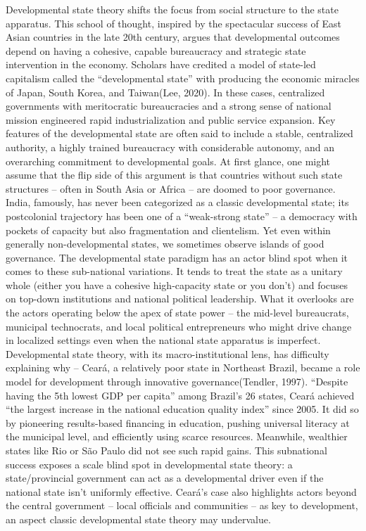 Developmental state theory shifts the focus from social structure to the state apparatus. This school of thought, inspired by the spectacular success of East Asian countries in the late 20th century, argues that developmental outcomes depend on having a cohesive, capable bureaucracy and strategic state intervention in the economy. Scholars have credited a model of state-led capitalism called the “developmental state” with producing the economic miracles of Japan, South Korea, and Taiwan(Lee, 2020). In these cases, centralized governments with meritocratic bureaucracies and a strong sense of national mission engineered rapid industrialization and public service expansion. Key features of the developmental state are often said to include a stable, centralized authority, a highly trained bureaucracy with considerable autonomy, and an overarching commitment to developmental goals. At first glance, one might assume that the flip side of this argument is that countries without such state structures – often in South Asia or Africa – are doomed to poor governance. India, famously, has never been categorized as a classic developmental state; its postcolonial trajectory has been one of a “weak-strong state” – a democracy with pockets of capacity but also fragmentation and clientelism. Yet even within generally non-developmental states, we sometimes observe islands of good governance. The developmental state paradigm has an actor blind spot when it comes to these sub-national variations. It tends to treat the state as a unitary whole (either you have a cohesive high-capacity state or you don’t) and focuses on top-down institutions and national political leadership. What it overlooks are the actors operating below the apex of state power – the mid-level bureaucrats, municipal technocrats, and local political entrepreneurs who might drive change in localized settings even when the national state apparatus is imperfect. Developmental state theory, with its macro-institutional lens, has difficulty explaining why – Ceará, a relatively poor state in Northeast Brazil, became a role model for development through innovative governance(Tendler, 1997). “Despite having the 5th lowest GDP per capita” among Brazil’s 26 states, Ceará achieved “the largest increase in the national education quality index” since 2005. It did so by pioneering results-based financing in education, pushing universal literacy at the municipal level, and efficiently using scarce resources. Meanwhile, wealthier states like Rio or São Paulo did not see such rapid gains. This subnational success exposes a scale blind spot in developmental state theory: a state/provincial government can act as a developmental driver even if the national state isn’t uniformly effective. Ceará’s case also highlights actors beyond the central government – local officials and communities – as key to development, an aspect classic developmental state theory may undervalue.

